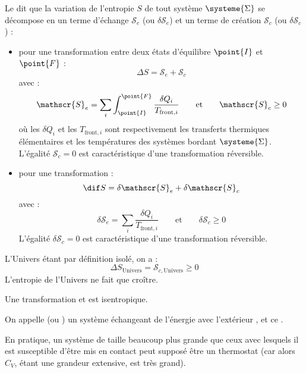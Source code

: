 \begin{definition}
Le  dit que la variation de l'entropie $S$ de tout système $\systeme{\Sigma}$  se décompose en un terme d'échange $\mathscr{S}_e$ (ou $\delta \mathscr{S}_e$) et un terme de création $\mathscr{S}_c$ (ou $\delta \mathscr{S}_c$) :
\begin{itemize}
\item pour une transformation entre deux états d'équilibre $\point{I}$ et $\point{F}$ :
\[\Delta S = \mathscr{S}_e + \mathscr{S}_c\]
avec :
\[\mathscr{S}_e = \sum_i \int_{\point{I}}^{\point{F}} \frac{\delta Q_i}{T_{\mathrm{front}, i}} \qquad \text{et} \qquad \mathscr{S}_c \geq 0\]
où les $\delta Q_i$ et les $T_{\mathrm{front}, i}$ sont respectivement les transferts thermiques élémentaires et les températures des systèmes bordant $\systeme{\Sigma}$. L'égalité $\mathscr{S}_c = 0$ est caractéristique d'une transformation réversible.

\item pour une transformation  :
\[\dif S = \delta \mathscr{S}_e + \delta \mathscr{S}_c\]
avec :
\[\delta \mathscr{S}_e = \sum_i \frac{\delta Q_i}{T_{\mathrm{front}, i}} \qquad \text{et} \qquad \delta \mathscr{S}_c \geq 0\]
L'égalité $\delta \mathscr{S}_c = 0$ est caractéristique d'une transformation réversible.
\end{itemize}
\end{definition}

\begin{remarque}
L'Univers étant par définition isolé, on a :
\[\Delta S_{\mathrm{Univers}} = \mathscr{S}_{c, \mathrm{Univers}} \geq 0\]
L'entropie de l'Univers ne fait que croître.
\end{remarque}

\begin{propriete}
Une transformation  et  est isentropique.
\end{propriete}

\begin{definition}
On appelle  (ou ) un système  échangeant de l'énergie avec l'extérieur , et ce .
\end{definition}

\begin{remarque}
En pratique, un système de taille beaucoup plus grande que ceux avec lesquels il est susceptible d'être mis en contact peut supposé être un thermostat (car alors $C_V$, étant une grandeur extensive, est très grand).
\end{remarque}

